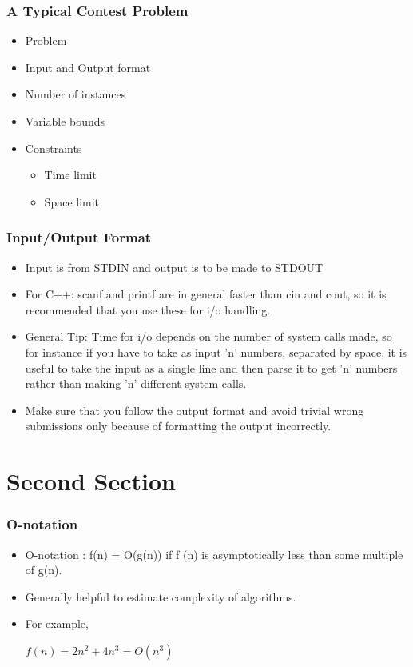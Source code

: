 \documentclass{beamer}
\begin{document}

\begin{frame}
\frametitle{A Typical Contest Problem}
\begin{itemize}

\item Problem
\item Input and Output format
\item Number of instances
\item Variable bounds
\item Constraints
\begin{itemize}
\item Time limit
\item Space limit
\end{itemize}
\end{itemize}
\end{frame}


\begin{frame}
\frametitle{Input/Output Format}
\begin{itemize}
\item Input is from STDIN and output is to be made to STDOUT
\item For C++: scanf and printf are in general faster than cin and cout, so it is recommended that you use these for i/o handling.
\item General Tip: Time for i/o depends on the number of system calls made, so for instance if you have to take as input 'n' numbers, separated by space, it is useful to take the input as a single line and then parse it to get 'n' numbers rather than making 'n' different system calls.
\item Make sure that you follow the output format and avoid trivial wrong submissions only because of formatting the output incorrectly.
\end{itemize}
\end{frame}

\section{Second Section}

\begin{frame}
\frametitle{O-notation}
\begin{itemize}
\item O-notation : \newline
f(n) = O(g(n)) if f (n) is asymptotically less than some
multiple of g(n).
\item Generally helpful to estimate complexity of algorithms.
\item For example,

$f(n) = 2n^2 + 4n^3 = O(n^3)$
\end{itemize}
\end{frame}
\end{document}
